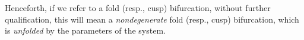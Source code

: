 \documentclass[11pt]{amsart}
\renewcommand{\k}{\kappa}
\newcommand{\R}{\mathbb{R}}
\theoremstyle{definition}
\newcommand\red[1]{\textcolor{red}{#1}}
\begin{document}
Henceforth, if we refer to a fold (resp., cusp) bifurcation, without further qualification, this will mean a {\em nondegenerate} fold (resp., cusp) bifurcation, which is {\em unfolded} by the parameters of the system.

\end{document}
